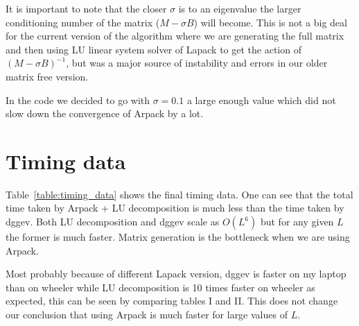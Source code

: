 \documentclass[%
 reprint,
 amsmath,amssymb,
 aps,
]{revtex4-2}
\begin{document}
It is important to note that the closer $\sigma$ is to an eigenvalue the larger conditioning number of the matrix ($M - \sigma B$) will become. This is not a big deal for the current version of the algorithm where we are generating the full matrix and then using LU linear system solver of Lapack to get the action of $(M - \sigma B)^{-1}$, but was a major source of instability and errors in our older matrix free version.

In the code we decided to go with $\sigma = 0.1$ a large enough value which did not slow down the convergence of Arpack by a lot.


\section{\label{sec:Timing data} Timing data}


Table~\ref{table:timing_data} shows the final timing data. One can see that the total time taken by Arpack + LU decomposition is much less than the time taken by dggev. Both LU decomposition and dggev scale as $O(L^6)$ but for any given $L$ the former is much faster. Matrix generation is the bottleneck when we are using Arpack.

Most probably because of different Lapack version, dggev is faster on my laptop than on wheeler while LU decomposition is 10 times faster on wheeler as expected, this can be seen by comparing tables I and II. This does not change our conclusion that using Arpack is much faster for large values of $L$.
\end{document}
